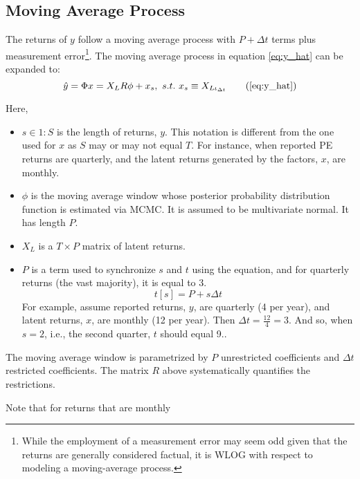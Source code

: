 \documentclass[11pt]{article}
\begin{document}
\subsection{Moving Average Process}
The returns of $y$ follow a moving average process with $P + \Delta t$ terms plus measurement error\footnote{While the employment of a measurement error may seem odd given that the returns are generally considered factual, it is WLOG with respect to modeling a moving-average process.}. The moving average process in equation \eqref{eq:y_hat} can be expanded to:
\begin{equation}
	\hat{y} = \Phi x = X_L R \phi + x_s, ~s.t.~ x_s \equiv X_{L\iota_{\Delta t}} \tag{\ref{eq:y_hat}}
\end{equation}

Here, 
\begin{itemize}
	\item $s \in 1:S$ is the length of returns, $y$. This notation is different from the one used for $x$ as $S$ may or may not equal $T$. For instance, when reported PE returns are quarterly, and the latent returns generated by the factors, $x$, are monthly. 
	\item $\phi$ is the moving average window whose posterior probability distribution function is estimated via MCMC. It is assumed to be multivariate normal. It has length $P$.
	\item $X_L$ is a $T \times P$ matrix of latent returns.
	\item $P$ is a term used to synchronize $s$ and $t$ using the equation, and for quarterly returns (the vast majority), it is equal to 3.
	\begin{equation}
		t[s] = P + s \Delta t
	\end{equation}
	For example, assume reported returns, $y$, are quarterly (4 per year), and latent returns, $x$, are monthly (12 per year). Then $\Delta t = \frac{12}{4} = 3$. And so, when $s=2$, i.e., the second quarter, $t$ should equal 9..
\end{itemize}

The moving average window is parametrized by $P$ unrestricted coefficients and $\Delta t$ restricted coefficients. The matrix $R$ above systematically quantifies the restrictions. 

Note that for returns that are monthly 


\end{document}
